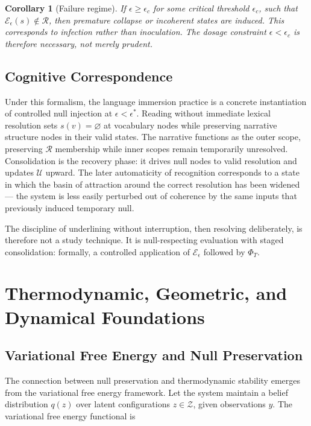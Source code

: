 \documentclass[11pt]{article}
\newtheorem{corollary}{Corollary}
\theoremstyle{remark}
\begin{document}
\begin{corollary}[Failure regime]
If $\epsilon \geq \epsilon_c$ for some critical threshold $\epsilon_c$, such that $\mathcal{E}_\epsilon(s) \notin \mathcal{R}$, then premature collapse or incoherent states are induced. This corresponds to infection rather than inoculation. The dosage constraint $\epsilon < \epsilon_c$ is therefore necessary, not merely prudent.
\end{corollary}

\subsection{Cognitive Correspondence}

Under this formalism, the language immersion practice is a concrete instantiation of controlled null injection at $\epsilon < \epsilon^*$. Reading without immediate lexical resolution sets $s(v) = \varnothing$ at vocabulary nodes while preserving narrative structure nodes in their valid states. The narrative functions as the outer scope, preserving $\mathcal{R}$ membership while inner scopes remain temporarily unresolved. Consolidation is the recovery phase: it drives null nodes to valid resolution and updates $\mathcal{U}$ upward. The later automaticity of recognition corresponds to a state in which the basin of attraction around the correct resolution has been widened --- the system is less easily perturbed out of coherence by the same inputs that previously induced temporary null.

The discipline of underlining without interruption, then resolving deliberately, is therefore not a study technique. It is null-respecting evaluation with staged consolidation: formally, a controlled application of $\mathcal{E}_\epsilon$ followed by $\Phi_T$.


\section{Thermodynamic, Geometric, and Dynamical Foundations}
\label{sec:thermo}

\subsection{Variational Free Energy and Null Preservation}

The connection between null preservation and thermodynamic stability emerges from the variational free energy framework. Let the system maintain a belief distribution $q(z)$ over latent configurations $z \in \mathcal{Z}$, given observations $y$. The variational free energy functional is
\end{document}
